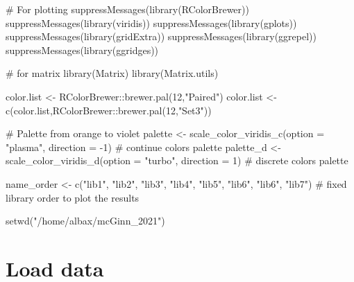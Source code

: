 \documentclass[
  letterpaper,
  DIV=11,
  numbers=noendperiod]{scrreprt}
\newenvironment{Shaded}{\begin{snugshade}}{\end{snugshade}}
\newcommand{\AttributeTok}[1]{\textcolor[rgb]{0.40,0.45,0.13}{#1}}
\newcommand{\CommentTok}[1]{\textcolor[rgb]{0.37,0.37,0.37}{#1}}
\newcommand{\DecValTok}[1]{\textcolor[rgb]{0.68,0.00,0.00}{#1}}
\newcommand{\FunctionTok}[1]{\textcolor[rgb]{0.28,0.35,0.67}{#1}}
\newcommand{\NormalTok}[1]{\textcolor[rgb]{0.00,0.23,0.31}{#1}}
\newcommand{\OtherTok}[1]{\textcolor[rgb]{0.00,0.23,0.31}{#1}}
\newcommand{\SpecialCharTok}[1]{\textcolor[rgb]{0.37,0.37,0.37}{#1}}
\newcommand{\StringTok}[1]{\textcolor[rgb]{0.13,0.47,0.30}{#1}}
\begin{document}
\begin{Shaded}
\begin{Highlighting}[]
\CommentTok{\# For plotting}
\FunctionTok{suppressMessages}\NormalTok{(}\FunctionTok{library}\NormalTok{(RColorBrewer))}
\FunctionTok{suppressMessages}\NormalTok{(}\FunctionTok{library}\NormalTok{(viridis))}
\FunctionTok{suppressMessages}\NormalTok{(}\FunctionTok{library}\NormalTok{(gplots))}
\FunctionTok{suppressMessages}\NormalTok{(}\FunctionTok{library}\NormalTok{(gridExtra))}
\FunctionTok{suppressMessages}\NormalTok{(}\FunctionTok{library}\NormalTok{(ggrepel))}
\FunctionTok{suppressMessages}\NormalTok{(}\FunctionTok{library}\NormalTok{(ggridges))}

\CommentTok{\# for matrix }
\FunctionTok{library}\NormalTok{(Matrix)}
\FunctionTok{library}\NormalTok{(Matrix.utils)}

\NormalTok{color.list }\OtherTok{\textless{}{-}}\NormalTok{ RColorBrewer}\SpecialCharTok{::}\FunctionTok{brewer.pal}\NormalTok{(}\DecValTok{12}\NormalTok{,}\StringTok{"Paired"}\NormalTok{)}
\NormalTok{color.list }\OtherTok{\textless{}{-}} \FunctionTok{c}\NormalTok{(color.list,RColorBrewer}\SpecialCharTok{::}\FunctionTok{brewer.pal}\NormalTok{(}\DecValTok{12}\NormalTok{,}\StringTok{"Set3"}\NormalTok{))}

\CommentTok{\# Palette from orange to violet}
\NormalTok{palette }\OtherTok{\textless{}{-}} \FunctionTok{scale\_color\_viridis\_c}\NormalTok{(}\AttributeTok{option =} \StringTok{"plasma"}\NormalTok{, }\AttributeTok{direction =} \SpecialCharTok{{-}}\DecValTok{1}\NormalTok{) }\CommentTok{\# continue colors palette}
\NormalTok{palette\_d }\OtherTok{\textless{}{-}} \FunctionTok{scale\_color\_viridis\_d}\NormalTok{(}\AttributeTok{option =} \StringTok{"turbo"}\NormalTok{, }\AttributeTok{direction =} \DecValTok{1}\NormalTok{) }\CommentTok{\# discrete colors palette}

\NormalTok{name\_order }\OtherTok{\textless{}{-}} \FunctionTok{c}\NormalTok{(}\StringTok{"lib1"}\NormalTok{, }\StringTok{"lib2"}\NormalTok{, }\StringTok{"lib3"}\NormalTok{, }\StringTok{"lib4"}\NormalTok{, }\StringTok{"lib5"}\NormalTok{, }\StringTok{"lib6"}\NormalTok{, }\StringTok{"lib6"}\NormalTok{, }\StringTok{"lib7"}\NormalTok{) }\CommentTok{\# fixed library order to plot the results}

\FunctionTok{setwd}\NormalTok{(}\StringTok{"/home/albax/mcGinn\_2021"}\NormalTok{)}
\end{Highlighting}
\end{Shaded}

\section{Load data}\label{load-data}
\end{document}
